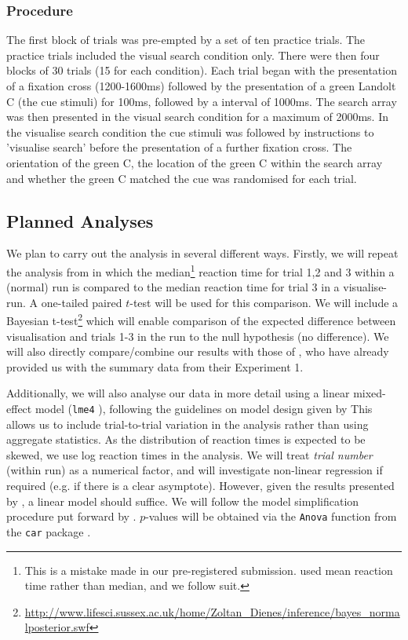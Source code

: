 \documentclass[smallextended]{svjour3}       %
\begin{document}
\subsubsection{Procedure}
The first block of trials was pre-empted by a set of ten practice trials. The practice trials included the visual search condition only. There were then four blocks of 30 trials (15 for each condition). Each trial began with the presentation of a fixation cross (1200-1600ms) followed by the presentation of a green Landolt C (the cue stimuli) for 100ms, followed by a interval of 1000ms. The search array was then presented in the visual search condition for a maximum of 2000ms. In the visualise search condition the cue stimuli was followed by instructions to 'visualise search' before the presentation of a further fixation cross. The orientation of the green C, the location of the green C within the search array and whether the green C matched the cue was randomised for each trial.

\subsection{Planned Analyses}

We plan to carry out the analysis in several different ways. Firstly, we will repeat the analysis from \cite{reinhart2015} in which the median\footnote{This is a mistake made in our pre-registered submission. \cite{reinhart2015} used mean reaction time rather than median, and we follow suit.}  reaction time for trial 1,2 and 3 within a (normal) run is compared to the median reaction time for trial 3 in a visualise-run. A one-tailed paired $t$-test will be used for this comparison. We will include a Bayesian t-test\footnote{\url{http://www.lifesci.sussex.ac.uk/home/Zoltan_Dienes/inference/bayes_normalposterior.swf}} which will enable comparison of the expected difference between visualisation and trials 1-3 in the run to the null hypothesis (no difference). We will also directly compare/combine our results with those of \cite{reinhart2015}, who have already provided us with the summary data from their Experiment 1. 

Additionally, we will also analyse our data in more detail using a linear mixed-effect model (\texttt{lme4} \citep{bates2015, R}), following the guidelines on model design given by \cite{barr2013} This allows us to include trial-to-trial variation in the analysis rather than using aggregate statistics. As the distribution of reaction times is expected to be skewed, we use log reaction times in the analysis. We will treat \textit{trial number} (within run) as a numerical factor, and will investigate non-linear regression if required (e.g. if there is a clear asymptote). However, given the results presented by \cite{reinhart2015}, a linear model should suffice. We will follow the model simplification procedure put forward by \cite[chapter 9]{crawley2012}. $p$-values will be obtained via the \texttt{Anova} function from the \texttt{car} package \citep{fox2011}.
\end{document}
